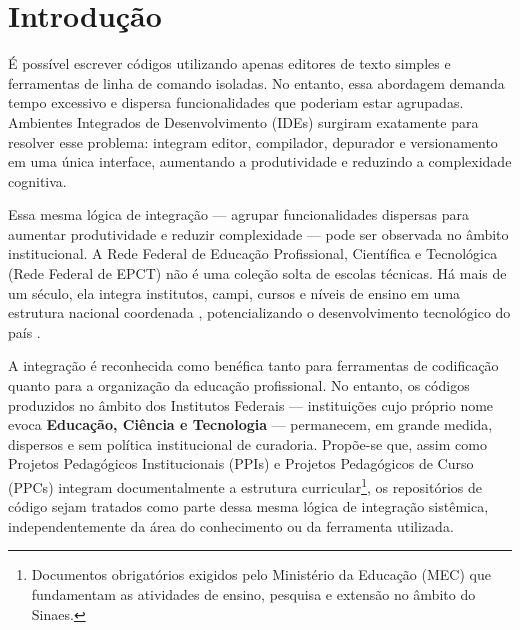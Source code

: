 \documentclass[english, spanish, brazilian]{RBIEarticle}
\begin{document}
\begin{otherlanguage}{spanish}
\begin{abstract}
<Aquí viene el resumen del artículo en español. El resumen debe resumir el contenido del manuscrito y debe contener un mínimo de 150 y un máximo de 300~palabras y debe estar escrito en cursiva, Times~10, justificado, sin sangría especial y sin espacio antes o después.>
\keywords <El resumen debe ir seguido de 3 a 10 palabras clave. Las palabras clave deben estar justificadas con un espacio de línea simple, sin sangría especial, sin espacios antes y con un espacio de exactamente 24 puntos después. El texto debe configurarse fuente Times con tamaño de 10 puntos y en estilo de fuente cursiva. Utilice punto y coma como separador. Las palabras clave deben comenzar con una letra mayúscula.>
\end{abstract}
\end{otherlanguage}

		
%	
\section{Introdução}
	
	É possível escrever códigos utilizando apenas editores de texto simples e ferramentas de linha de comando isoladas. No entanto, essa abordagem demanda tempo excessivo e dispersa funcionalidades que poderiam estar agrupadas. Ambientes Integrados de Desenvolvimento (IDEs) surgiram exatamente para resolver esse problema: integram editor, compilador, depurador e versionamento em uma única interface, aumentando a produtividade e reduzindo a complexidade cognitiva.
	
	Essa mesma lógica de integração — agrupar funcionalidades dispersas para aumentar produtividade e reduzir complexidade — pode ser observada no âmbito institucional. A Rede Federal de Educação Profissional, Científica e Tecnológica (Rede Federal de EPCT) não é uma coleção solta de escolas técnicas. Há mais de um século, ela integra institutos, campi, cursos e níveis de ensino em uma estrutura nacional coordenada \cite{lei11922_2008}, potencializando o desenvolvimento tecnológico do país \cite{pacheco2011}.
	
	A integração é reconhecida como benéfica tanto para ferramentas de codificação quanto para a organização da educação profissional. No entanto, os códigos produzidos no âmbito dos Institutos Federais — instituições cujo próprio nome evoca \textbf{Educação, Ciência e Tecnologia} — permanecem, em grande medida, dispersos e sem política institucional de curadoria. Propõe-se que, assim como Projetos Pedagógicos Institucionais (PPIs) e Projetos Pedagógicos de Curso (PPCs) integram documentalmente a estrutura curricular\footnote{Documentos obrigatórios exigidos pelo Ministério da Educação (MEC) que fundamentam as atividades de ensino, pesquisa e extensão no âmbito do Sinaes.}, os repositórios de código sejam tratados como parte dessa mesma lógica de integração sistêmica, independentemente da área do conhecimento ou da ferramenta utilizada.
	
\end{document}
